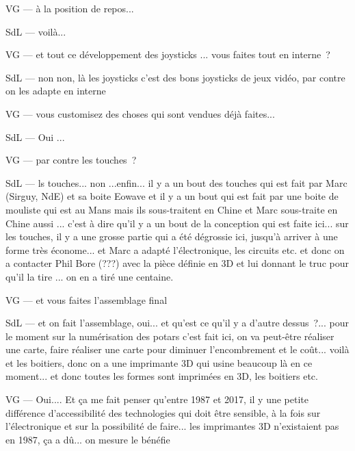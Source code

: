 VG — à la position de repos... 

SdL — voilà... 

VG — et tout ce développement des joysticks ... vous faites tout en interne ? 

SdL — non non, là les joysticks c'est des bons joysticks de jeux vidéo, par contre on les adapte en interne 

VG — vous customisez des choses qui sont vendues déjà faites... 

SdL — Oui ... 

VG — par contre les touches ? 

SdL — ls touches... non ...enfin... il y a un bout des touches qui est fait par Marc (Sirguy, NdE) et sa boite Eowave et il y a un bout qui est fait par une boite de mouliste qui est au Mans mais ils sous-traitent en Chine et Marc sous-traite en Chine aussi ... c'est à dire qu'il y a un bout de la conception qui est faite ici... sur les touches, il y a une grosse partie qui a été dégrossie ici, jusqu'à arriver à une forme très économe... et Marc a adapté l'électronique, les circuits etc. et donc on a contacter Phil Bore (???) avec la pièce définie en 3D et lui donnant le truc pour qu'il la tire ... on en a tiré une centaine. 

VG — et vous faites l'assemblage final 

SdL — et on fait l'assemblage, oui... et qu'est ce qu'il y a d'autre dessus ?... pour le moment sur la numérisation des potars c'est fait ici, on va peut-être réaliser une carte, faire réaliser une carte pour diminuer l'encombrement et le coût... voilà et les boitiers, donc on a une imprimante 3D qui usine beaucoup là en ce moment... et donc toutes les formes sont imprimées en 3D, les boitiers etc. 

VG — Oui.... Et ça me fait penser qu'entre 1987 et 2017, il y une petite différence d'accessibilité des technologies qui doit être sensible, à la fois sur l'électronique et sur la possibilité de faire... les imprimantes 3D n'existaient pas en 1987, ça a dû... on mesure le bénéfie 

